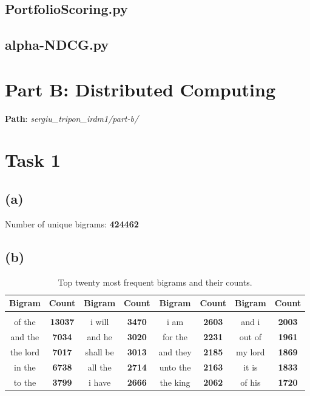 \documentclass{article} %
\begin{document}
\subsection*{PortfolioScoring.py \cite{wang2009portfolio} \cite{markowitz1952portfolio}}

\subsection*{alpha-NDCG.py \cite{clarke2008novelty}}

\section*{Part B: Distributed Computing}

\textbf{Path}: \textit{sergiu\_tripon\_irdm1/part-b/}

\section*{Task 1}

\subsection*{(a)}

Number of unique bigrams: \textbf{424462}

\subsection*{(b)}

\begin{table}[!htbp]
\caption{Top twenty most frequent bigrams and their counts.}
\label{table:1}
\begin{center}
\begin{tabular}{c c c c c c c c}
\multicolumn{1}{c}{\bf Bigram} & \multicolumn{1}{c}{\bf Count} & \multicolumn{1}{c}{\bf Bigram} & \multicolumn{1}{c}{\bf Count} &
\multicolumn{1}{c}{\bf Bigram} & \multicolumn{1}{c}{\bf Count} & 
\multicolumn{1}{c}{\bf Bigram} & \multicolumn{1}{c}{\bf Count}
\\ \hline \\
of the & \textbf{13037} & i will & \textbf{3470} & i am & \textbf{2603} & and i & \textbf{2003}\\

and the  & \textbf{7034}  & and he   & \textbf{3020} & for the  & \textbf{2231} & out of   & \textbf{1961}\\

the lord & \textbf{7017}  & shall be & \textbf{3013} & and they & \textbf{2185} & my lord  & \textbf{1869}\\

in the   & \textbf{6738}  & all the  & \textbf{2714} & unto the & \textbf{2163} & it is    & \textbf{1833}\\

to the   & \textbf{3799}  & i have   & \textbf{2666} & the king & \textbf{2062} & of his   & \textbf{1720}\\


\end{tabular}
\end{center}
\end{table}
\end{document}
